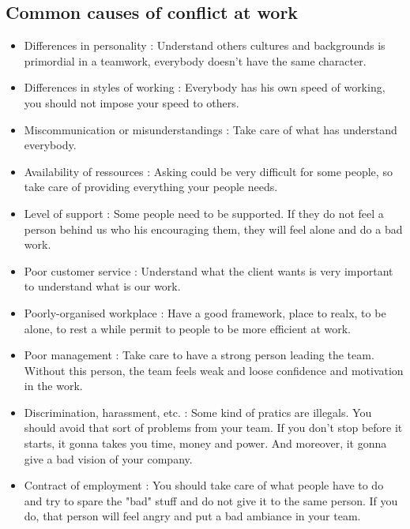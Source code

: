 \documentclass[a4paper,12pt]{report} %
\begin{document}
\subsection{Common causes of conflict at work}
\begin{itemize}
\item Differences in personality : Understand others cultures and backgrounds is primordial in a teamwork, everybody doesn't have the same character.
\item Differences in styles of working : Everybody has his own speed of working, you should not impose your speed to others.
\item Miscommunication or misunderstandings : Take care of what has understand everybody.
\item Availability of ressources : Asking could be very difficult for some people, so take care of providing everything your people needs.
\item Level of support : Some people need to be supported. If they do not feel a person behind us who his encouraging them, they will feel alone and do a bad work.
\item Poor customer service : Understand what the client wants is very important to understand what is our work.
\item Poorly-organised workplace : Have a good framework, place to realx, to be alone, to rest a while permit to people to be more efficient at work.
\item Poor management : Take care to have a strong person leading the team. Without this person, the team feels weak and loose confidence and motivation in the work.
\item Discrimination, harassment, etc. : Some kind of pratics are illegals. You should avoid that sort of problems from your team. If you don't stop before it starts, it gonna takes you time, money and power. And moreover, it gonna give a bad vision of your company.
\item Contract of employment : You should take care of what people have to do and try to spare the "bad" stuff and do not give it to the same person. If you do, that person will feel angry and put a bad ambiance in your team.
\end{itemize}
\end{document}

